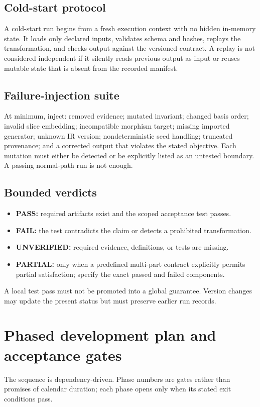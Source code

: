\documentclass[11pt,oneside]{article}
\begin{document}
\subsection{Cold-start protocol}
A cold-start run begins from a fresh execution context with no hidden in-memory state. It loads only declared inputs, validates schema and hashes, replays the transformation, and checks output against the versioned contract. A replay is not considered independent if it silently reads previous output as input or reuses mutable state that is absent from the recorded manifest.

\subsection{Failure-injection suite}
At minimum, inject: removed evidence; mutated invariant; changed basis order; invalid slice embedding; incompatible morphism target; missing imported generator; unknown IR version; nondeterministic seed handling; truncated provenance; and a corrected output that violates the stated objective. Each mutation must either be detected or be explicitly listed as an untested boundary. A passing normal-path run is not enough.

\subsection{Bounded verdicts}
\begin{itemize}
  \item \textbf{PASS:} required artifacts exist and the scoped acceptance test passes.
  \item \textbf{FAIL:} the test contradicts the claim or detects a prohibited transformation.
  \item \textbf{UNVERIFIED:} required evidence, definitions, or tests are missing.
  \item \textbf{PARTIAL:} only when a predefined multi-part contract explicitly permits partial satisfaction; specify the exact passed and failed components.
\end{itemize}
A local test pass must not be promoted into a global guarantee. Version changes may update the present status but must preserve earlier run records.

\section{Phased development plan and acceptance gates}
The sequence is dependency-driven. Phase numbers are gates rather than promises of calendar duration; each phase opens only when its stated exit conditions pass.
\end{document}
